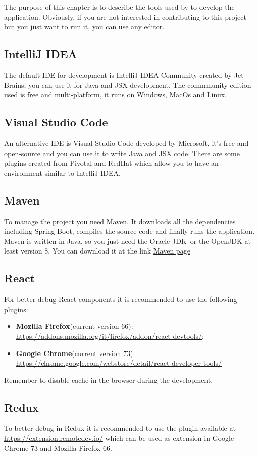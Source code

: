 The purpose of this chapter is to describe the tools used by \gruppo{} to develop the application.
Obviously, if you are not interested in contributing to this project but you just want to run it, you can use any editor.
\subsection{IntelliJ IDEA}
The default IDE for development is IntelliJ IDEA Community created by Jet Brains, you can use it for Java and JSX development. The commmunity edition used is free and multi-platform, it runs on Windows, MacOs and Linux.

\subsection{Visual Studio Code}
An alternative IDE is Visual Studio Code developed by Microsoft, it's free and open-source and you can use it to write Java and JSX code. There are some plugins created from Pivotal and RedHat which allow you to have an environment similar to IntelliJ IDEA.

\subsection{Maven}
To manage the project you need Maven. It downloads all the dependencies including Spring Boot, compiles the source code and finally runs the application. Maven is written in Java, so you just need the {Oracle JDK}\ or the OpenJDK at least version 8.
You can download it at the link \href{https://maven.apache.org/}{Maven page}

\subsection{React}
For better debug React components it is recommended to use the following plugins:
\begin{itemize}
\item \textbf{Mozilla Firefox}(current version 66): \\
\url{https://addons.mozilla.org/it/firefox/addon/react-devtools/};
\item \textbf{Google Chrome}(current version 73): \\
\href{https://chrome.google.com/webstore/detail/react-developer-tools/fmkadmapgofadopljbjfkapdkoienihi}{https://chrome.google.com/webstore/detail/react-developer-tools/}
\end{itemize}
Remember to disable cache in the browser during the development.

\subsection{Redux}
To better debug in Redux it is recommended to use the plugin available at\\ \url{https://extension.remotedev.io/} which can be used as extension in Google Chrome 73 and Mozilla Firefox 66.

 
